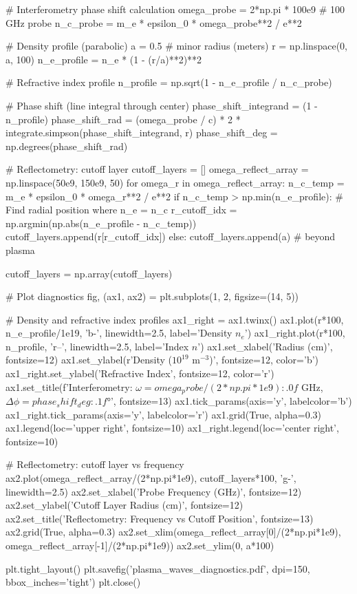 \documentclass[11pt,a4paper]{article}
\begin{document}
\begin{pycode}
# Interferometry phase shift calculation
omega_probe = 2*np.pi * 100e9  # 100 GHz probe
n_c_probe = m_e * epsilon_0 * omega_probe**2 / e**2

# Density profile (parabolic)
a = 0.5  # minor radius (meters)
r = np.linspace(0, a, 100)
n_e_profile = n_e * (1 - (r/a)**2)**2

# Refractive index profile
n_profile = np.sqrt(1 - n_e_profile / n_c_probe)

# Phase shift (line integral through center)
phase_shift_integrand = (1 - n_profile)
phase_shift_rad = (omega_probe / c) * 2 * integrate.simpson(phase_shift_integrand, r)
phase_shift_deg = np.degrees(phase_shift_rad)

# Reflectometry: cutoff layer
cutoff_layers = []
omega_reflect_array = np.linspace(50e9, 150e9, 50)
for omega_r in omega_reflect_array:
    n_c_temp = m_e * epsilon_0 * omega_r**2 / e**2
    if n_c_temp > np.min(n_e_profile):
        # Find radial position where n_e = n_c
        r_cutoff_idx = np.argmin(np.abs(n_e_profile - n_c_temp))
        cutoff_layers.append(r[r_cutoff_idx])
    else:
        cutoff_layers.append(a)  # beyond plasma

cutoff_layers = np.array(cutoff_layers)

# Plot diagnostics
fig, (ax1, ax2) = plt.subplots(1, 2, figsize=(14, 5))

# Density and refractive index profiles
ax1_right = ax1.twinx()
ax1.plot(r*100, n_e_profile/1e19, 'b-', linewidth=2.5, label='Density $n_e$')
ax1_right.plot(r*100, n_profile, 'r--', linewidth=2.5, label='Index $n$')
ax1.set_xlabel('Radius (cm)', fontsize=12)
ax1.set_ylabel(r'Density ($10^{19}$ m$^{-3}$)', fontsize=12, color='b')
ax1_right.set_ylabel('Refractive Index', fontsize=12, color='r')
ax1.set_title(f'Interferometry: $\omega = {omega_probe/(2*np.pi*1e9):.0f}$ GHz, $\Delta\phi = {phase_shift_deg:.1f}°$',
              fontsize=13)
ax1.tick_params(axis='y', labelcolor='b')
ax1_right.tick_params(axis='y', labelcolor='r')
ax1.grid(True, alpha=0.3)
ax1.legend(loc='upper right', fontsize=10)
ax1_right.legend(loc='center right', fontsize=10)

# Reflectometry: cutoff layer vs frequency
ax2.plot(omega_reflect_array/(2*np.pi*1e9), cutoff_layers*100,
         'g-', linewidth=2.5)
ax2.set_xlabel('Probe Frequency (GHz)', fontsize=12)
ax2.set_ylabel('Cutoff Layer Radius (cm)', fontsize=12)
ax2.set_title('Reflectometry: Frequency vs Cutoff Position', fontsize=13)
ax2.grid(True, alpha=0.3)
ax2.set_xlim(omega_reflect_array[0]/(2*np.pi*1e9),
             omega_reflect_array[-1]/(2*np.pi*1e9))
ax2.set_ylim(0, a*100)

plt.tight_layout()
plt.savefig('plasma_waves_diagnostics.pdf', dpi=150, bbox_inches='tight')
plt.close()
\end{pycode}
\end{document}

